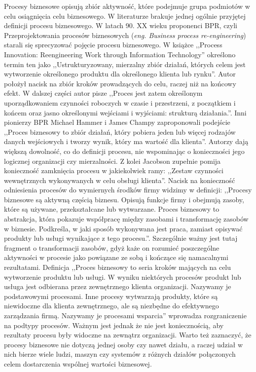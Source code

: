 Procesy biznesowe opisują zbiór aktywność, które podejmuje grupa podmiotów w celu osiągnięcia celu biznesowego. W literaturze brakuje jednej ogólnie przyjętej definicji procesu biznesowego. W latach 90. XX wieku proponenci BPR, czyli Przeprojektowania procesów biznesowych (\textit{eng. Business process re-engineering}) starali się sprecyzować pojęcie procesu biznesowego. W książce ,,Process Innovation: Reengineering Work through Information Technology''\cite{davenport1993process} określono termin ten jako ,,Ustrukturyzowany, mierzalny zbiór działań, których celem jest wytworzenie określonego produktu dla określonego klienta lub rynku''. Autor położył nacisk na zbiór kroków prowadzących do celu, raczej niż na końcowy efekt. W dalszej części autor pisze ,,Proces jest zatem określonym uporządkowaniem czynności roboczych w czasie i przestrzeni, z początkiem i końcem oraz jasno określonymi wejściami i wyjściami: strukturą działania.''. Inni pionierzy BPR Michael Hammer i James Champy zaproponowali  podejście ,,Proces biznesowy to zbiór działań, który pobiera jeden lub więcej rodzajów danych wejściowych i tworzy wynik, który ma wartość dla klienta''\cite{HAMMER199390}. Autorzy dają większą dowolność, co do definicji procesu, nie wspominając o konieczności jego logicznej organizacji czy mierzalności. Z kolei Jacobson zupełnie pomija konieczność zamknięcia procesu w jakiekolwiek ramy: ,,Zestaw czynności wewnętrznych wykonywanych w celu obsługi klienta''\cite{JacobsonObjectAdvantage}. Nacisk na konieczność odniesienia procesów do wymiernych środków firmy widzimy w definicji: ,,Procesy biznesowe są aktywną częścią biznesu. Opisują funkcje firmy i obejmują zasoby, które są używane, przekształcane lub wytwarzane. Proces biznesowy to abstrakcja, która pokazuje współpracę między zasobami i transformację zasobów w biznesie. Podkreśla, w jaki sposób wykonywana jest praca, zamiast opisywać produkty lub usługi wynikające z tego procesu.''\cite{Eriksson2000BusinessMW}. Szczególnie ważny jest tutaj fragment o transformacji zasobów, gdyż każe on rozumieć poszczególne aktywności w procesie jako powiązane ze sobą i kończące się namacalnymi rezultatami. Definicja ,,Proces biznesowy to seria kroków mających na celu wytworzenie produktu lub usługi. W wyniku niektórych procesów produkt lub usługa jest odbierana przez zewnętrznego klienta organizacji. Nazywamy je podstawowymi procesami. Inne procesy wytwarzają produkty, które są niewidoczne dla klienta zewnętrznego, ale są niezbędne do efektywnego zarządzania firmą. Nazywamy je procesami wsparcia''\cite{rummler_brache_1995} wprowadza rozgraniczenie na podtypy procesów. Ważnym jest jednak że nie jest koniecznością, aby rezultaty procesu były widoczne na zewnątrz organizacji. Warto też zaznaczyć, że procesy biznesowe nie dotyczą jednej osoby czy nawet działu, a raczej udział w nich bierze wiele ludzi, maszyn czy systemów z różnych działów połączonych celem dostarczenia wspólnej wartości biznesowej.

